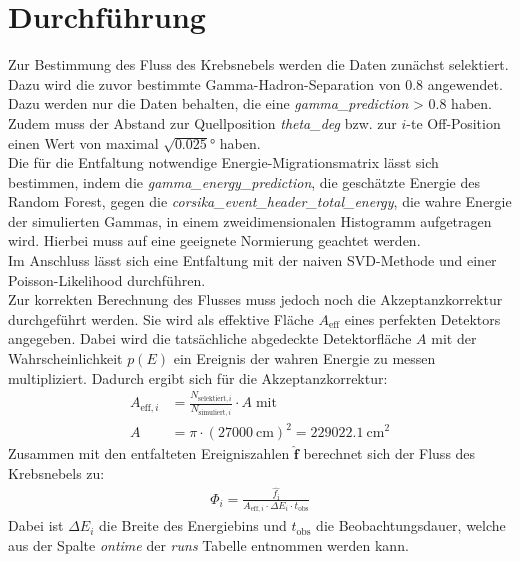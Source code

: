\section{Durchführung}
Zur Bestimmung des Fluss des Krebsnebels werden die Daten zunächst selektiert. Dazu wird die zuvor bestimmte Gamma-Hadron-Separation von $0.8$ angewendet. Dazu werden nur die Daten behalten, die eine \textit{gamma\_prediction} \textgreater \; $0.8$ haben. Zudem muss der Abstand zur Quellposition \textit{theta\_deg} bzw. zur $i$-te Off-Position einen Wert von maximal $\sqrt{0.025}\si{\degree}$ haben.\\
Die für die Entfaltung notwendige Energie-Migrationsmatrix lässt sich bestimmen, indem die \textit{gamma\_energy\_prediction}, die geschätzte Energie des Random Forest, gegen die \textit{corsika\_event\_header\_total\_energy}, die wahre Energie der simulierten Gammas, in einem zweidimensionalen Histogramm aufgetragen wird. Hierbei muss auf eine geeignete Normierung geachtet werden.\\
Im Anschluss lässt sich eine Entfaltung mit der naiven SVD-Methode und einer Poisson-Likelihood durchführen.\\
Zur korrekten Berechnung des Flusses muss jedoch noch die Akzeptanzkorrektur durchgeführt werden. Sie wird als effektive Fläche $A_{\text{eff}}$ eines perfekten Detektors angegeben. Dabei wird die tatsächliche abgedeckte Detektorfläche $A$ mit der Wahrscheinlichkeit $p(E)$ ein Ereignis der wahren Energie zu messen multipliziert. Dadurch ergibt sich für die Akzeptanzkorrektur:\\
\begin{align}
	A_{\text{eff},i} &= \frac{N_{\text{selektiert},i}}{N_{\text{simuliert},i}} \cdot A \; \text{mit}\\
	A &= \pi \cdot (\SI{27000}{\centi\meter})^2 = \SI{229022.1}{\centi\meter}^2
	\label{eqn:Aeff}
\end{align}
Zusammen mit den entfalteten Ereigniszahlen $\hat{{\pmb{f}}}$ berechnet sich der Fluss des Krebsnebels zu:
\begin{align}
	\Phi_{i} = \frac{\hat{f_{\mathrm{i}}}}{A_{\text{eff},i} \cdot \Delta E_{i} \cdot t_{\text{obs}} }
	\label{eqn:phi}
\end{align}
Dabei ist $\Delta E_{i}$ die Breite des Energiebins und $t_{\text{obs}}$ die Beobachtungsdauer, welche aus der Spalte \textit{ontime} der \textit{runs} Tabelle entnommen werden kann.
